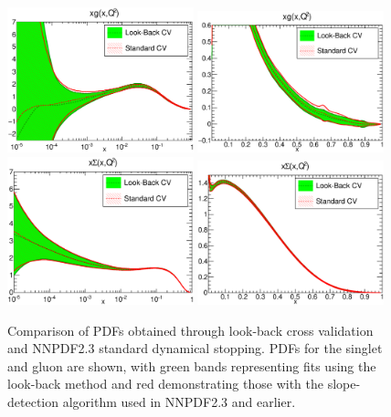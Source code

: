 \begin{figure}[h!]
\centering
\includegraphics[width=0.48\textwidth]{7-PostLHC/figs/LB30kvsDYN/pdf_xg_log.eps}
\includegraphics[width=0.48\textwidth]{7-PostLHC/figs/LB30kvsDYN/pdf_xg.eps}\\
\includegraphics[width=0.48\textwidth]{7-PostLHC/figs/LB30kvsDYN/pdf_xsigma_log.eps}
\includegraphics[width=0.48\textwidth]{7-PostLHC/figs/LB30kvsDYN/pdf_xsigma.eps}
\caption[Comparison of PDFs obtained through look-back cross validation and NNPDF2.3 standard dynamical stopping]{Comparison of PDFs obtained through look-back cross validation and NNPDF2.3 standard dynamical stopping. PDFs for the singlet and gluon are shown, with green bands representing fits using the look-back method and red demonstrating those with the slope-detection algorithm used in NNPDF2.3 and earlier.}
\label{fig:30kLBvsDYN}
\end{figure}
 
